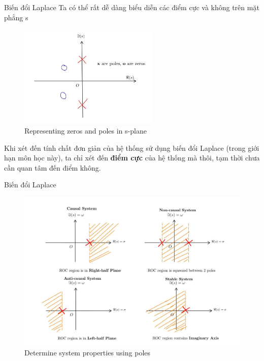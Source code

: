 \documentclass[8pt]{beamer}
\begin{document}
\begin{frame}{Biến đổi Laplace}
Ta có thể rất dễ dàng biểu diễn các điểm cực và không trên mặt phẳng s
\begin{figure}[h]
			\includegraphics[width=0.6\textwidth]{zero.jpg}
			\caption{Representing zeros and poles in s-plane}\label{fig:re3}

		\end{figure}
		Khi xét đến tính chất đơn giản của hệ thống sử dụng biến đổi Laplace (trong giới hạn môn học này), ta chỉ xét đến \textbf{\alert{điểm cực}} của hệ thống mà thôi, tạm thời chưa cần quan tâm đến điểm không.
\end{frame}
\begin{frame}{Biến đổi Laplace}
\begin{figure}[h]
			\includegraphics[width=1\textwidth]{r.jpg}
			\caption{Determine system properties using poles}\label{fig:re4}

		\end{figure}

\end{frame}
\end{document}
